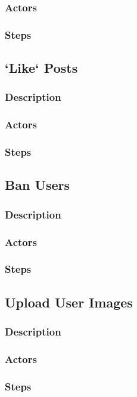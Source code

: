 \documentclass[12pt]{scrartcl}
\begin{document}
\subsubsection{Actors}
\subsubsection{Steps}

\subsection{`Like` Posts}
\subsubsection{Description}
\subsubsection{Actors}
\subsubsection{Steps}

\subsection{Ban Users}
\subsubsection{Description}
\subsubsection{Actors}
\subsubsection{Steps}

\subsection{Upload User Images}
\subsubsection{Description}
\subsubsection{Actors}
\subsubsection{Steps}
\end{document}
